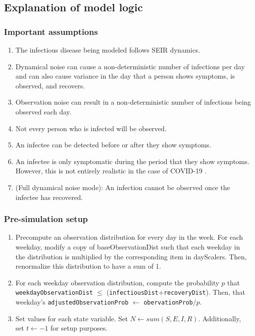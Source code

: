 \documentclass{article}
\newcommand{\code}[1]{\texttt{#1}}
\begin{document}
\subsection{Explanation of model logic}

\subsubsection{Important assumptions}

\begin{enumerate}
	\item The infectious disease being modeled follows SEIR dynamics.
	\item Dynamical noise can cause a non-deterministic number of infections per day and can also cause variance in the day that a person shows symptoms, is observed, and recovers.
	\item Observation noise can result in a non-deterministic number of infections being observed each day.
	\item Not every person who is infected will be observed.
	\item An infectee can be detected before or after they show symptoms.
	\item An infectee is only symptomatic during the period that they show symptoms. However, this is not entirely realistic in the case of COVID-19 \cite{asymptomatic}.
	\item (Full dynamical noise mode): An infection cannot be observed once the infectee has recovered.
\end{enumerate}

\subsubsection{Pre-simulation setup}

\begin{enumerate}
    \item Precompute an observation distribution for every day in the week. For each weekday, modify a copy of baseObservationDist such that each weekday in the distribution is multiplied by the corresponding item in dayScalers. Then, renormalize this distribution to have a sum of 1.

    \item For each weekday observation distribution, compute the probability $p$ that \code{weekdayObservationDist} $\leq$ (\code{infectiousDist}+\code{recoveryDist}). Then, that weekday's \code{adjustedObservationProb} $\gets$ \code{obervationProb}$/p$. 
    
    \item Set values for each state variable. Set $N \gets sum(S, E, I, R)$. Additionally, set $t \gets -1$ for setup purposes.

\end{enumerate}
\end{document}
